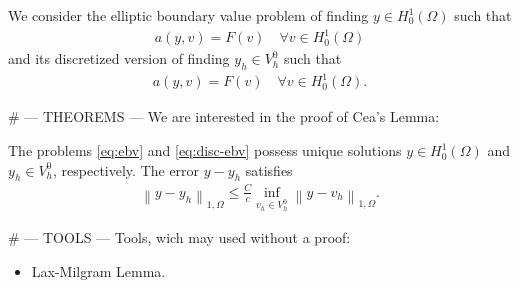We consider the elliptic boundary value problem of finding \(y \in H^1_0(\Omega)\) such that
%
\begin{gather}\label{eq:ebv}
    a\left(y,v\right) = F(v) \quad \forall v \in H^1_0(\Omega)
\end{gather}
%
and its discretized version of finding \(y_h \in V^0_h\) such that
%
\begin{gather*}\label{eq:disc-ebv}
    a\left(y,v\right) = F(v) \quad \forall v \in H^1_0(\Omega).
\end{gather*}
%

# --- THEOREMS ---
We are interested in the proof of Cea's Lemma:
%
\begin{theorem}
    The problems \eqref{eq:ebv} and \eqref{eq:disc-ebv} possess unique solutions \(y \in H^1_0(\Omega)\) and \(y_h \in V^0_h\), respectively. 
    The error \(y-y_h\) satisfies
    \begin{gather*}
        \left\|y-y_h\right\|_{1,\Omega} \leq \frac{C}{c} \inf_{v_h \in V^0_h} \left\|y-v_h\right\|_{1,\Omega}.
    \end{gather*}
\end{theorem}
%

# --- TOOLS ---
Tools, wich may used without a proof:
%
\begin{itemize}
    \item Lax-Milgram Lemma.
\end{itemize}